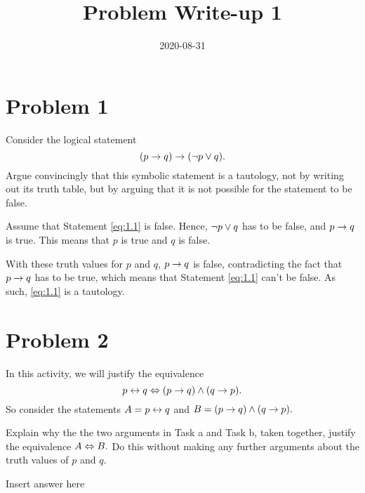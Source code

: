 \documentclass[12pt,a4paper]{article}
\title{Problem Write-up 1}
\date{2020-08-31}
\begin{document}
	\section{Problem 1}
    \begin{problem}
        Consider the logical statement
        \begin{equation} \label{eq:1.1}
        	(p \rightarrow q) \rightarrow (\neg p \vee q) \text{.}
        \end{equation}
        Argue convincingly that this symbolic statement is a tautology, not by writing out its truth table, but by arguing that it is not possible for the statement to be false.
    \end{problem}
    
    \begin{answer}
        Assume that Statement \ref{eq:1.1} is false. Hence, \(\neg p \vee q\) has to be false, and \(p \rightarrow q\) is true. This means that \(p\) is true and \(q\) is false.

       	With these truth values for \(p\) and \(q\), \(p \rightarrow q\) is false, contradicting the fact that \(p \rightarrow q\) has to be true, which means that Statement \ref{eq:1.1} can't be false. As such, \eqref{eq:1.1} is a tautology.
        
    \end{answer}

    \section{Problem 2}
    \begin{problem}
        In this activity, we will justify the equivalence
        \begin{equation} \label{eq:2.1}
        	p \leftrightarrow q \Leftrightarrow (p\rightarrow q) \wedge (q \rightarrow p) \text{.}
        \end{equation}
        So consider the statements \(A = p \leftrightarrow q\) and \(B = (p\rightarrow q) \wedge (q \rightarrow p)\text{.}\)

        Explain why the the two arguments in Task a and Task b, taken together, justify the equivalence \(A \Leftrightarrow B\text{.}\) Do this without making any further arguments about the truth values of \(p\) and \(q\).
    \end{problem}
    
    \begin{answer}
        Insert answer here
    \end{answer}
    
\end{document}
